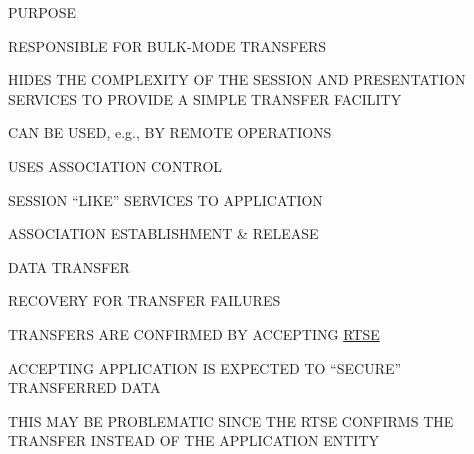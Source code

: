 %




\begin{bwslide}

\begin{nrtc}
\item	PURPOSE
	\begin{nrtc}
	\item	RESPONSIBLE FOR BULK-MODE TRANSFERS
	\item	HIDES THE COMPLEXITY OF THE SESSION AND PRESENTATION SERVICES
		TO PROVIDE A SIMPLE TRANSFER FACILITY
	\item	CAN BE USED, e.g., BY REMOTE OPERATIONS
	\item	USES ASSOCIATION CONTROL
	\end{nrtc}
\end{nrtc}
\end{bwslide}


\begin{bwslide}

\begin{nrtc}
\item	SESSION ``LIKE'' SERVICES TO APPLICATION
\item	ASSOCIATION ESTABLISHMENT \& RELEASE
\item	DATA TRANSFER
	\begin{nrtc}
	\item	RECOVERY FOR TRANSFER FAILURES
	\end{nrtc}
\end{nrtc}
\end{bwslide}


\begin{bwslide}

\begin{nrtc}
\item	TRANSFERS ARE CONFIRMED BY ACCEPTING \underline{RTSE}
\item	ACCEPTING APPLICATION IS EXPECTED TO ``SECURE'' TRANSFERRED DATA
	\begin{nrtc}
	\item	THIS MAY BE PROBLEMATIC SINCE THE RTSE CONFIRMS THE TRANSFER INSTEAD
		OF THE APPLICATION ENTITY
	\end{nrtc}
\end{nrtc}
\end{bwslide}


